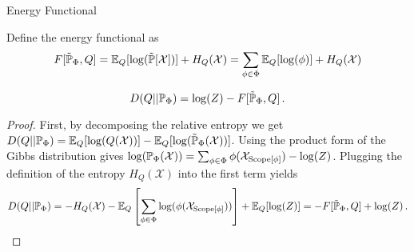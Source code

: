 \begin{frame}{Energy Functional}
    \begin{definition}
    Define the energy functional as
    \begin{equation}
        F[\tilde{\Pb}_{\Phi},Q] = \E_Q[\log(\tilde{\Pb}[\mathcal{X}])]  + H_Q(\mathcal{X}) = \sum_{\phi \in \Phi} \E_Q[\log(\phi)] + H_Q(\mathcal{X})
    \end{equation}
    \end{definition}
\pause
    \begin{theorem}
    \label{thm:energy-functional}
    \begin{equation}
        D(Q || \Pb_{\Phi}) = \log(Z) - F[\tilde{\Pb}_{\Phi},Q]\,.
    \end{equation}
    \end{theorem}
\pause
    \begin{proof}
        First, by decomposing the relative entropy we get
            $
            D(Q || \Pb_{\Phi}) = \E_Q[\log(Q(\mathcal{X}))] - \E_Q[\log(\tilde{\Pb}_{\Phi}(\mathcal{X}))]
            $.
\pause
        Using the product form of the Gibbs distribution gives
            $
            \log(\Pb_{\Phi}(\mathcal{X})) = \sum_{\phi \in \Phi} \phi(\mathcal{X}_{\Scope[\phi]}) - \log(Z)
        $.
\pause
        Plugging the definition of the entropy $H_Q(\mathcal{X})$ into the first term yields
        \begin{equation}
            D(Q || \Pb_{\Phi}) = -H_Q(\mathcal{X}) - \E_{Q}\left[ \sum_{\phi \in \Phi} \log(\phi(\mathcal{X}_{\Scope[\phi]})) \right] + \E_Q[\log(Z)] = -F[\tilde{\Pb}_{\Phi},Q] + \log(Z)\,.
        \end{equation}
    \end{proof}
\end{frame}

